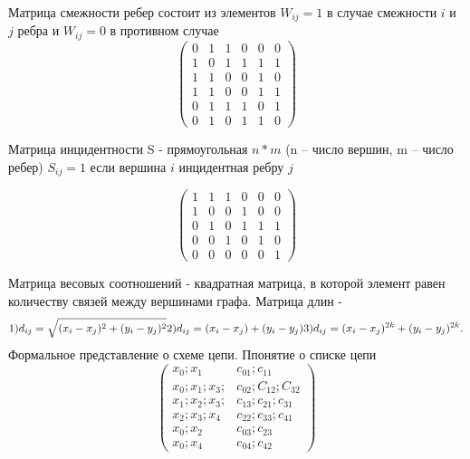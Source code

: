 \documentclass{article}
\begin{document}
Матрица смежности ребер состоит из элементов $W_{ij} = 1$ в случае смежности $i$ и $j$ ребра и $W_{ij} = 0$ в противном случае
$$
\begin{pmatrix}
0 & 1 &1 & 0 & 0 & 0\\
1 & 0 & 1 & 1 & 1 & 1\\
1 & 1 & 0 & 0 & 1 & 0\\
1 & 1 & 0 & 0 & 1 & 1\\
0 & 1 & 1 & 1 & 0 & 1\\
0 & 1 & 0 & 1 & 1 & 0
\end{pmatrix}
$$

Матрица инцидентности S - прямоугольная $n * m$ (n -- число вершин, m -- число ребер) $S_{ij} = 1$ если вершина $i$ инцидентная ребру $j$

$$
\begin{pmatrix}
1 & 1 & 1 & 0 & 0 & 0\\
1 & 0 & 0 & 1 & 0 & 0\\
0 & 1 & 0 & 1 & 1 & 1\\
0 & 0& 1 & 0 & 1 & 0\\
0 & 0 & 0 & 0 & 0 & 1
\end{pmatrix}
$$

Матрица весовых соотношений - квадратная матрица, в которой элемент равен количеству связей между вершинами графа.
Матрица длин -
\[
1) d_{ij} = \sqrt{(x_i - x_j) ^ 2 + (y_i - y_j)^2}\\
2) d_{ij} = (x_i - x_j) + (y_i - y_j)\\
3) d_{ij} = (x_i - x_j)^{2k} + (y_i - y_j)^{2k}\\
.\]
Формальное представление о схеме цепи. Ппонятие о списке цепи
$$
\begin{pmatrix}
	x_0;x_1 & c_{01}; c_{11}\\
	x_0;x_1;x_3; & c_{02}; C_{12}; C_{32}\\
	x_1;x_2;x_3; & c_{13}; c_{21}; c_{31}\\
	x_2;x_3;x_4 & c_{22}; c_{33}; c_{41}\\
	x_0;x_2 & c_{03}; c_{23}\\
	x_0;x_4 & c_{04}; c_{42}
\end{pmatrix}
$$
\end{document}
